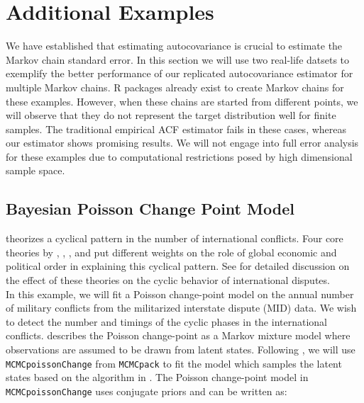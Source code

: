 \documentclass[11pt]{article}
\theoremstyle{remark}
\begin{document}
\section{Additional Examples}
We have established that estimating autocovariance is crucial to estimate the Markov chain standard error.  In this section we will use two real-life datsets to exemplify the better performance of our replicated autocovariance estimator for multiple Markov chains. R packages already exist to create Markov chains for these examples. However, when these chains are started from different points, we will observe that they do not represent the target distribution well for finite samples. The traditional empirical ACF estimator fails in these cases, whereas our estimator shows promising results. We will not engage into full error analysis for these examples due to computational restrictions posed by high dimensional sample space. 
\subsection{Bayesian Poisson Change Point Model}

\cite{pollins1996global} theorizes a cyclical pattern in the number of international conflicts. Four core theories by \cite{gilpin1981war}, \cite{wallerstein1983three}, \cite{goldstein1988long}, and \cite{modelski1988seapower} put different weights on the role of global economic and political order in explaining this cyclical pattern. See \cite{martin2011mcmcpack} for detailed discussion on the effect of these theories on the cyclic behavior of international disputes.\\

In this example, we will fit a Poisson change-point model on the annual number of military conflicts from the militarized interstate dispute (MID) data. We wish to detect the number and timings of the cyclic phases in the international conflicts. \cite{chib1998estimation} describes the Poisson change-point as a Markov mixture model where observations are assumed to be drawn from latent states. Following \cite{martin2011mcmcpack}, we will use \texttt{MCMCpoissonChange} from \texttt{MCMCpack} to fit the model which samples the latent states based on the algorithm in \cite{chib1998estimation}. The Poisson change-point model in \texttt{MCMCpoissonChange} uses conjugate priors and can be written as:
\end{document}
